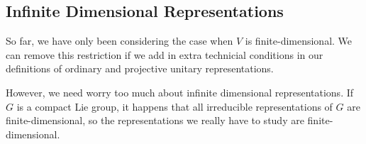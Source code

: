 \subsection{Infinite Dimensional Representations}
So far, we have only been considering the case when $V$ is finite-dimensional. We can remove this restriction if we add in extra technicial conditions in our definitions of ordinary and projective unitary representations.

However, we need worry too much about infinite dimensional representations. If $G$ is a compact Lie group, it happens that all irreducible representations of $G$ are finite-dimensional, so the representations we really have to study are finite-dimensional.
